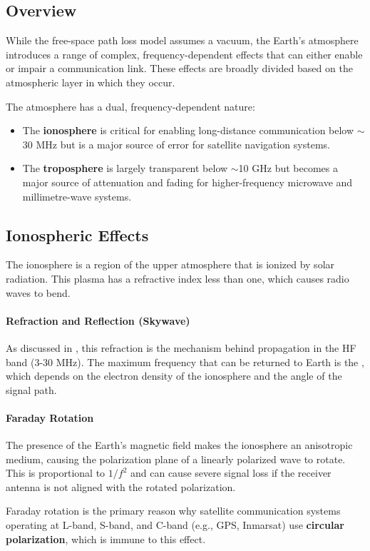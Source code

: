 \subsection{Overview}

While the free-space path loss model assumes a vacuum, the Earth's atmosphere introduces a range of complex, frequency-dependent effects that can either enable or impair a communication link. These effects are broadly divided based on the atmospheric layer in which they occur.

\begin{keyconcept}
    The atmosphere has a dual, frequency-dependent nature:
    \begin{itemize}
        \item The \textbf{ionosphere} is critical for enabling long-distance communication below $\sim$30 MHz but is a major source of error for satellite navigation systems.
        \item The \textbf{troposphere} is largely transparent below $\sim$10 GHz but becomes a major source of attenuation and fading for higher-frequency microwave and millimetre-wave systems.
    \end{itemize}
\end{keyconcept}


\subsection{Ionospheric Effects}

The ionosphere is a region of the upper atmosphere that is ionized by solar radiation. This plasma has a refractive index less than one, which causes radio waves to bend.

\paragraph{Refraction and Reflection (Skywave)}
As discussed in , this refraction is the mechanism behind  propagation in the HF band (3-30 MHz). The maximum frequency that can be returned to Earth is the , which depends on the electron density of the ionosphere and the angle of the signal path.

\paragraph{Faraday Rotation}
The presence of the Earth's magnetic field makes the ionosphere an anisotropic medium, causing the polarization plane of a linearly polarized wave to rotate. This  is proportional to $1/f^2$ and can cause severe signal loss if the receiver antenna is not aligned with the rotated polarization.
\begin{warningbox}
    Faraday rotation is the primary reason why satellite communication systems operating at L-band, S-band, and C-band (e.g., GPS, Inmarsat) use \textbf{circular polarization}, which is immune to this effect.
\end{warningbox}

